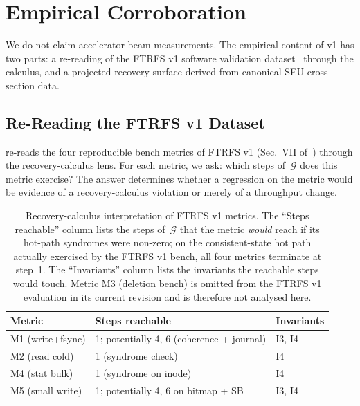 \section{Empirical Corroboration}\label{sec:empirical}

We do not claim accelerator-beam measurements. The empirical content
of v1 has two parts: a re-reading of the FTRFS v1 software validation
dataset~\cite{desbrieres2026ftrfs} through the calculus, and a
projected recovery surface derived from canonical SEU cross-section
data.

\subsection{Re-Reading the FTRFS v1 Dataset}

 re-reads the four reproducible bench
metrics of FTRFS v1 (Sec.~VII of~\cite{desbrieres2026ftrfs}) through
the recovery-calculus lens. For each metric, we ask: which steps
of~\(\mathcal{G}\) does this metric exercise? The answer determines
whether a regression on the metric would be evidence of a
recovery-calculus violation or merely of a throughput change.

\begin{table}[ht]
\centering\small
\caption{Recovery-calculus interpretation of FTRFS v1 metrics. The
``Steps reachable'' column lists the steps of~\(\mathcal{G}\) that
the metric \emph{would} reach if its hot-path syndromes were non-zero;
on the consistent-state hot path actually exercised by the FTRFS v1
bench, all four metrics terminate at step~1. The ``Invariants'' column
lists the invariants the reachable steps would touch.
Metric M3 (deletion bench) is omitted from the FTRFS v1 evaluation
in its current revision and is therefore not analysed here.}
\label{tab:ftrfs-recovery}
\begin{tabularx}{\columnwidth}{@{}l X l@{}}
\toprule
\textbf{Metric} & \textbf{Steps reachable} & \textbf{Invariants} \\
\midrule
M1 (write+fsync) & 1; potentially 4, 6 (coherence + journal) & I3, I4 \\
M2 (read cold)   & 1 (syndrome check)                        & I4 \\
M4 (stat bulk)   & 1 (syndrome on inode)                     & I4 \\
M5 (small write) & 1; potentially 4, 6 on bitmap + SB        & I3, I4 \\
\bottomrule
\end{tabularx}
\end{table}

